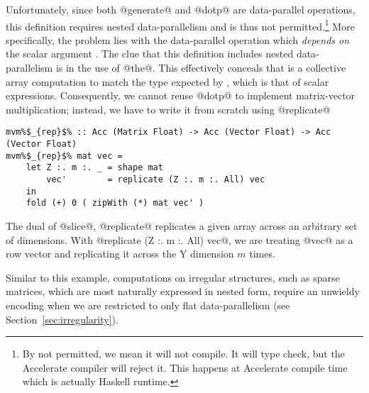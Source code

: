 Unfortunately, since both @generate@ and @dotp@ are data-parallel operations,
this definition requires nested data-parallelism and is thus not permitted.\footnote{By not permitted, we mean it will not compile. It will type check, but the Accelerate compiler will reject it. This happens at Accelerate compile time which is actually Haskell runtime.}
%
More specifically, the problem lies with the data-parallel operation
 which \emph{depends on} the scalar argument . The clue that
this definition includes nested data-parallelism is in the use of @the@.
This effectively conceals that  is a collective array computation to match the type expected by , which is that of scalar expressions.
Consequently, we cannot reuse @dotp@ to implement matrix-vector multiplication; instead, we have to write it from scratch using @replicate@
%
\begin{lstlisting}
mvm%$_{rep}$% :: Acc (Matrix Float) -> Acc (Vector Float) -> Acc (Vector Float)
mvm%$_{rep}$% mat vec =
    let Z :. m :. _ = shape mat
        vec'        = replicate (Z :. m :. All) vec
    in
    fold (+) 0 ( zipWith (*) mat vec' )
\end{lstlisting}
%
The dual of @slice@, @replicate@ replicates a given array across an arbitrary set of dimensions. With @replicate (Z :. m :. All) vec@, we are treating @vec@ as a row vector and replicating it across the Y dimension $m$ times.

Similar to this example, computations on irregular structures, such as sparse matrices, which are most naturally expressed in nested form, require an unwieldy encoding when we are restricted to only flat data-parallelism (see Section~\ref{sec:irregularity}).


